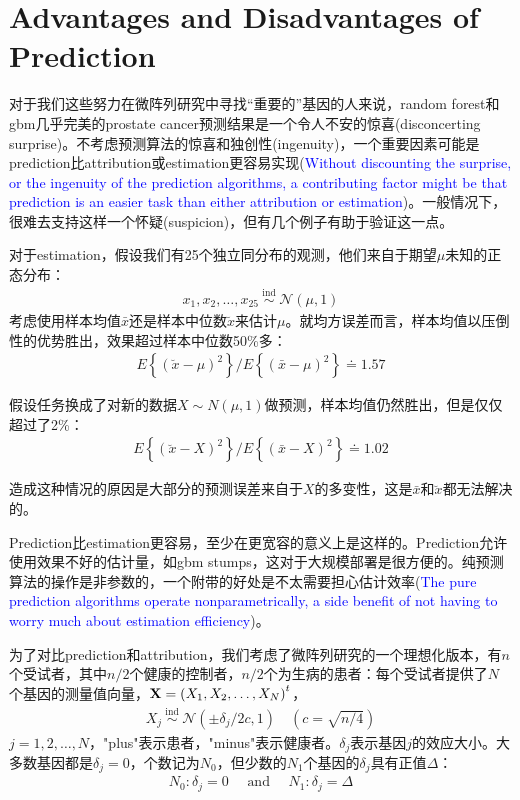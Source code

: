 \documentclass[lang=cn,11pt,a4paper,cite=authoryear]{elegantpaper}
\begin{document}
\section{Advantages and Disadvantages of Prediction}

对于我们这些努力在微阵列研究中寻找“重要的”基因的人来说，random forest和gbm几乎完美的prostate cancer预测结果是一个令人不安的惊喜(disconcerting surprise)。不考虑预测算法的惊喜和独创性(ingenuity)，一个重要因素可能是prediction比attribution或estimation更容易实现(\textcolor{blue}{Without discounting the surprise, or the ingenuity of the prediction algorithms, a contributing factor might be that prediction is an easier task than either attribution or estimation})。一般情况下，很难去支持这样一个怀疑(suspicion)，但有几个例子有助于验证这一点。

对于estimation，假设我们有25个独立同分布的观测，他们来自于期望$\mu$未知的正态分布：
\begin{align}
x_{1}, x_{2}, \ldots, x_{25} \stackrel{\text { ind }}{\sim} \mathcal{N}(\mu, 1)
\end{align}
考虑使用样本均值$\bar{x}$还是样本中位数$\breve{x}$来估计$\mu$。就均方误差而言，样本均值以压倒性的优势胜出，效果超过样本中位数50\%多：
\begin{align}
E\left\{(\breve{x}-\mu)^{2}\right\} / E\left\{(\bar{x}-\mu)^{2}\right\} \doteq 1.57
\end{align}

假设任务换成了对新的数据$X \sim N(\mu, 1)$做预测，样本均值仍然胜出，但是仅仅超过了2\%：
\begin{align}
E\left\{(\breve{x}-X)^{2}\right\} / E\left\{(\bar{x}-X)^{2}\right\} \doteq 1.02
\end{align}

造成这种情况的原因是大部分的预测误差来自于$X$的多变性，这是$\bar{x}$和$\breve{x}$都无法解决的。

Prediction比estimation更容易，至少在更宽容的意义上是这样的。Prediction允许使用效果不好的估计量，如gbm stumps，这对于大规模部署是很方便的。纯预测算法的操作是非参数的，一个附带的好处是不太需要担心估计效率(\textcolor{blue}{The pure prediction algorithms operate nonparametrically, a side benefit of not having to worry much about estimation efficiency})。

为了对比prediction和attribution，我们考虑了微阵列研究的一个理想化版本，有$n$个受试者，其中$n/2$个健康的控制者，$n/2$个为生病的患者：每个受试者提供了$N$个基因的测量值向量，$\bold{X}=\left(X_{1}, X_{2}, \ldots, X_{N}\right)^{t}$，
\begin{align}
\label{Xj}
X_{j} \stackrel{\text { ind }}{\sim} \mathcal{N}\left(\pm \delta_{j} / 2 c, 1\right) \quad(c=\sqrt{n / 4})
\end{align}
$j = 1, 2, \ldots, N$，"plus"表示患者，"minus"表示健康者。$\delta_j$表示基因$j$的效应大小。大多数基因都是$\delta_j = 0$，个数记为$N_0$，但少数的$N_1$个基因的$\delta_j$具有正值$\Delta$：
\begin{align}
N_{0}: \delta_{j}=0 \quad \text { and } \quad N_{1}: \delta_{j}=\Delta
\end{align}
\end{document}
